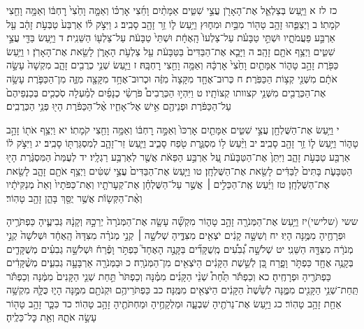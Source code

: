 \documentclass[twoside, openany, parskip=half, 11pt]{book}
\begin{document}
כז לז א וַיַּ֧עַשׂ בְּצַלְאֵ֛ל אֶת־הָאָרֹ֖ן עֲצֵ֣י שִׁטִּ֑ים אַמָּתַ֨יִם וָחֵ֜צִי אׇרְכּ֗וֹ וְאַמָּ֤ה וָחֵ֙צִי֙ רׇחְבּ֔וֹ וְאַמָּ֥ה וָחֵ֖צִי קֹמָתֽוֹ׃ ב וַיְצַפֵּ֛הוּ זָהָ֥ב טָה֖וֹר מִבַּ֣יִת וּמִח֑וּץ וַיַּ֥עַשׂ ל֛וֹ זֵ֥ר זָהָ֖ב סָבִֽיב׃ ג וַיִּצֹ֣ק ל֗וֹ אַרְבַּע֙ טַבְּעֹ֣ת זָהָ֔ב עַ֖ל אַרְבַּ֣ע פַּעֲמֹתָ֑יו וּשְׁתֵּ֣י טַבָּעֹ֗ת עַל־צַלְעוֹ֙ הָֽאֶחָ֔ת וּשְׁתֵּי֙ טַבָּעֹ֔ת עַל־צַלְע֖וֹ הַשֵּׁנִֽית׃ ד וַיַּ֥עַשׂ בַּדֵּ֖י עֲצֵ֣י שִׁטִּ֑ים וַיְצַ֥ף אֹתָ֖ם זָהָֽב׃ ה וַיָּבֵ֤א אֶת־הַבַּדִּים֙ בַּטַּבָּעֹ֔ת עַ֖ל צַלְעֹ֣ת הָאָרֹ֑ן לָשֵׂ֖את אֶת־הָאָרֹֽן׃ ו וַיַּ֥עַשׂ כַּפֹּ֖רֶת זָהָ֣ב טָה֑וֹר אַמָּתַ֤יִם וָחֵ֙צִי֙ אׇרְכָּ֔הּ וְאַמָּ֥ה וָחֵ֖צִי רׇחְבָּֽהּ׃ ז וַיַּ֛עַשׂ שְׁנֵ֥י כְרֻבִ֖ים זָהָ֑ב מִקְשָׁה֙ עָשָׂ֣ה אֹתָ֔ם מִשְּׁנֵ֖י קְצ֥וֹת הַכַּפֹּֽרֶת׃ ח כְּרוּב־אֶחָ֤ד מִקָּצָה֙ מִזֶּ֔ה וּכְרוּב־אֶחָ֥ד מִקָּצָ֖ה מִזֶּ֑ה מִן־הַכַּפֹּ֛רֶת עָשָׂ֥ה אֶת־הַכְּרֻבִ֖ים מִשְּׁנֵ֥י קצוותו קְצוֹתָֽיו׃ ט וַיִּהְי֣וּ הַכְּרֻבִים֩ פֹּרְשֵׂ֨י כְנָפַ֜יִם לְמַ֗עְלָה סֹֽכְכִ֤ים בְּכַנְפֵיהֶם֙ עַל־הַכַּפֹּ֔רֶת וּפְנֵיהֶ֖ם אִ֣ישׁ אֶל־אָחִ֑יו אֶ֨ל־הַכַּפֹּ֔רֶת הָי֖וּ פְּנֵ֥י הַכְּרֻבִֽים׃

י וַיַּ֥עַשׂ אֶת־הַשֻּׁלְחָ֖ן עֲצֵ֣י שִׁטִּ֑ים אַמָּתַ֤יִם אׇרְכּוֹ֙ וְאַמָּ֣ה רׇחְבּ֔וֹ וְאַמָּ֥ה וָחֵ֖צִי קֹמָתֽוֹ׃ יא וַיְצַ֥ף אֹת֖וֹ זָהָ֣ב טָה֑וֹר וַיַּ֥עַשׂ ל֛וֹ זֵ֥ר זָהָ֖ב סָבִֽיב׃ יב וַיַּ֨עַשׂ ל֥וֹ מִסְגֶּ֛רֶת טֹ֖פַח סָבִ֑יב וַיַּ֧עַשׂ זֵר־זָהָ֛ב לְמִסְגַּרְתּ֖וֹ סָבִֽיב׃ יג וַיִּצֹ֣ק ל֔וֹ אַרְבַּ֖ע טַבְּעֹ֣ת זָהָ֑ב וַיִּתֵּן֙ אֶת־הַטַּבָּעֹ֔ת עַ֚ל אַרְבַּ֣ע הַפֵּאֹ֔ת אֲשֶׁ֖ר לְאַרְבַּ֥ע רַגְלָֽיו׃ יד לְעֻמַּת֙ הַמִּסְגֶּ֔רֶת הָי֖וּ הַטַּבָּעֹ֑ת בָּתִּים֙ לַבַּדִּ֔ים לָשֵׂ֖את אֶת־הַשֻּׁלְחָֽן׃ טו וַיַּ֤עַשׂ אֶת־הַבַּדִּים֙ עֲצֵ֣י שִׁטִּ֔ים וַיְצַ֥ף אֹתָ֖ם זָהָ֑ב לָשֵׂ֖את אֶת־הַשֻּׁלְחָֽן׃ טז וַיַּ֜עַשׂ אֶֽת־הַכֵּלִ֣ים ׀ אֲשֶׁ֣ר עַל־הַשֻּׁלְחָ֗ן אֶת־קְעָרֹתָ֤יו וְאֶת־כַּפֹּתָיו֙ וְאֵת֙ מְנַקִּיֹּתָ֔יו וְאֶ֨ת־הַקְּשָׂוֺ֔ת אֲשֶׁ֥ר יֻסַּ֖ךְ בָּהֵ֑ן זָהָ֖ב טָהֽוֹר׃

ששי (שלישי)יז וַיַּ֥עַשׂ אֶת־הַמְּנֹרָ֖ה זָהָ֣ב טָה֑וֹר מִקְשָׁ֞ה עָשָׂ֤ה אֶת־הַמְּנֹרָה֙ יְרֵכָ֣הּ וְקָנָ֔הּ גְּבִיעֶ֛יהָ כַּפְתֹּרֶ֥יהָ וּפְרָחֶ֖יהָ מִמֶּ֥נָּה הָיֽוּ׃ יח וְשִׁשָּׁ֣ה קָנִ֔ים יֹצְאִ֖ים מִצִּדֶּ֑יהָ שְׁלֹשָׁ֣ה ׀ קְנֵ֣י מְנֹרָ֗ה מִצִּדָּהּ֙ הָֽאֶחָ֔ד וּשְׁלֹשָׁה֙ קְנֵ֣י מְנֹרָ֔ה מִצִּדָּ֖הּ הַשֵּׁנִֽי׃ יט שְׁלֹשָׁ֣ה גְ֠בִעִ֠ים מְֽשֻׁקָּדִ֞ים בַּקָּנֶ֣ה הָאֶחָד֮ כַּפְתֹּ֣ר וָפֶ֒רַח֒ וּשְׁלֹשָׁ֣ה גְבִעִ֗ים מְשֻׁקָּדִ֛ים בְּקָנֶ֥ה אֶחָ֖ד כַּפְתֹּ֣ר וָפָ֑רַח כֵּ֚ן לְשֵׁ֣שֶׁת הַקָּנִ֔ים הַיֹּצְאִ֖ים מִן־הַמְּנֹרָֽה׃ כ וּבַמְּנֹרָ֖ה אַרְבָּעָ֣ה גְבִעִ֑ים מְשֻׁ֨קָּדִ֔ים כַּפְתֹּרֶ֖יהָ וּפְרָחֶֽיהָ׃ כא וְכַפְתֹּ֡ר תַּ֩חַת֩ שְׁנֵ֨י הַקָּנִ֜ים מִמֶּ֗נָּה וְכַפְתֹּר֙ תַּ֣חַת שְׁנֵ֤י הַקָּנִים֙ מִמֶּ֔נָּה וְכַפְתֹּ֕ר תַּֽחַת־שְׁנֵ֥י הַקָּנִ֖ים מִמֶּ֑נָּה לְשֵׁ֙שֶׁת֙ הַקָּנִ֔ים הַיֹּצְאִ֖ים מִמֶּֽנָּה׃ כב כַּפְתֹּרֵיהֶ֥ם וּקְנֹתָ֖ם מִמֶּ֣נָּה הָי֑וּ כֻּלָּ֛הּ מִקְשָׁ֥ה אַחַ֖ת זָהָ֥ב טָהֽוֹר׃ כג וַיַּ֥עַשׂ אֶת־נֵרֹתֶ֖יהָ שִׁבְעָ֑ה וּמַלְקָחֶ֥יהָ וּמַחְתֹּתֶ֖יהָ זָהָ֥ב טָהֽוֹר׃ כד כִּכָּ֛ר זָהָ֥ב טָה֖וֹר עָשָׂ֣ה אֹתָ֑הּ וְאֵ֖ת כׇּל־כֵּלֶֽיהָ׃
\end{document}

